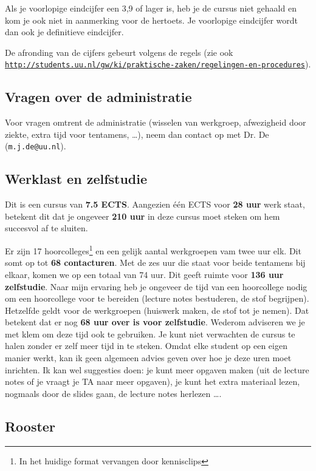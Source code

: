 \documentclass[a4paper,11pt]{article}
\begin{document}
Als je voorlopige eindcijfer een 3,9 of lager is, heb je de cursus niet gehaald en kom je ook niet in aanmerking voor de hertoets.
Je voorlopige eindcijfer wordt dan ook je definitieve eindcijfer.

De afronding van de cijfers gebeurt volgens de regels
(zie ook \href{http://students.uu.nl/gw/ki/praktische-zaken/regelingen-en-procedures}{\texttt{http://students.uu.nl/gw/ki/praktische-zaken/regelingen-en-procedures}}).

\subsection*{Vragen over de administratie}

Voor vragen omtrent de administratie (wisselen van werkgroep, afwezigheid door ziekte, extra tijd voor tentamens, \dots), neem dan contact op met Dr. De (\texttt{m.j.de@uu.nl}).

\subsection*{Werklast en zelfstudie}

Dit is een cursus van \textbf{7.5 ECTS}.
Aangezien één ECTS voor \textbf{28 uur} werk staat, betekent dit dat je ongeveer \textbf{210 uur} in deze cursus moet steken om hem succesvol af te sluiten.

Er zijn 17 hoorcolleges\footnote{%
  In het huidige format vervangen door kennisclips}
en een gelijk aantal werkgroepen vam twee uur elk.
Dit somt op tot \textbf{68 contacturen}.
Met de zes uur die staat voor beide tentamens bij elkaar, komen we op een totaal van 74 uur.
Dit geeft ruimte voor \textbf{136 uur zelfstudie}.
Naar mijn ervaring heb je ongeveer de tijd van een hoorcollege nodig om een hoorcollege voor te bereiden (lecture notes bestuderen, de stof begrijpen).
Hetzelfde geldt voor de werkgroepen (huiswerk maken, de stof tot je nemen).
Dat betekent dat er nog \textbf{68 uur over is voor zelfstudie}.
Wederom adviseren we je met klem om deze tijd ook te gebruiken.
Je kunt niet verwachten de cursus te halen zonder er zelf meer tijd in te steken.
Omdat elke student op een eigen manier werkt, kan ik geen algemeen advies geven over hoe je deze uren moet inrichten.
Ik kan wel suggesties doen: je kunt meer opgaven maken (uit de lecture notes of je vraagt je TA naar meer opgaven), je kunt het extra materiaal lezen, nogmaals door de slides gaan, de lecture notes herlezen \dots.

\subsection*{Rooster}
\end{document}
